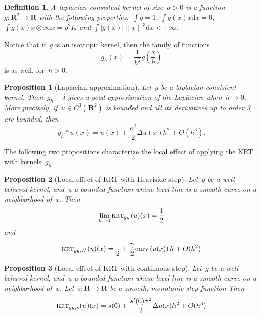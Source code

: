 \documentclass[12pt]{article}                  %
\newtheorem{definition}{Definition}
\newtheorem{proposition}{Proposition}
\begin{document}
\begin{definition}
	A~\emph{laplacian-consistent kernel of size~$\rho>0$} is a
	function~$g:\mathbf{R}^2\to\mathbf{R}$ with the following
	properties:~$\int g=1$, $\int g(x)x\mathrm{d} x=0$,
	$\int g(x)x\otimes x\mathrm{d} x=\rho^2 I_2$ and
	$\int \left|g(x)\right|\left\|x\right\|^3\mathrm{d} x<+\infty$.
\end{definition}

Notice that if~$g$ is an isotropic kernel, then the family of functions
\[
	g_h(x)=\frac1{h^2}g\left(\frac{x}{h}\right)
\]
is as well, for~$h>0$.

\begin{proposition}[Laplacian approximation]
	Let~$g$ be a laplacian-consistent kernel.
	Then~$g_h-\delta$ gives a good approximation of the
	Laplacian when~$h\to 0$.  More precisely, if~$u\in C^3(\mathbf{R}^2)$
	is bounded and all its derivatives up to order 3 are bounded,
	then
	\[
		g_h*u(x)=u(x)+\frac{\rho^2}{2}\Delta u(x) h^2 + O(h^3).
	\]
\end{proposition}

The following two propositions characterize the local effect of applying the
KRT with kernels~$g_h$.


\begin{proposition}[Local effect of KRT with Heaviside step]
	Let~$g$ be a well-behaved kernel, and~$u$ a bounded function whose
	level line is a smooth curve on a neighborhood of~$x$.  Then
	\[
		\lim_{h\to0} \textsc{krt}_{g_h}(u)(x) = \frac12
	\]
	and
	\[
		\textsc{krt}_{g_h,H}(u)(x) = \frac12 +
	\frac{\gamma}{2}\mathrm{curv}\left(u(x)\right)h + O(h^2)
	\]
\end{proposition}

\begin{proposition}[Local effect of KRT with continuous step]
	Let~$g$ be a well-behaved kernel, and~$u$ a bounded function whose
	level line is a smooth curve on a neighborhood of~$x$.
	Let~$s:\mathbf{R}\to\mathbf{R}$ be a smooth, monotonic step function
	Then
	\[
		\textsc{krt}_{g_h,s}(u)(x) = s(0) + \frac{s'(0)\sigma^2}2\Delta u(x)h^2
		+O(h^3)
	\]
\end{proposition}
\end{document}
